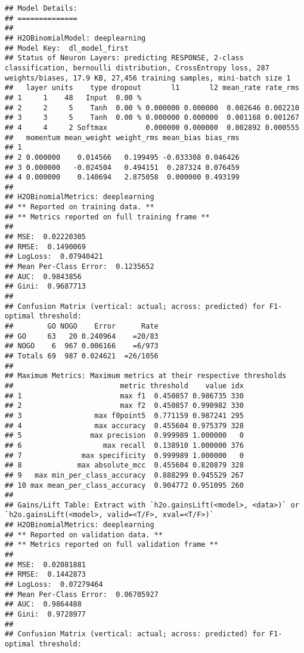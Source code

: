 \documentclass[]{article}
\begin{document}
\begin{verbatim}
## Model Details:
## ==============
## 
## H2OBinomialModel: deeplearning
## Model Key:  dl_model_first 
## Status of Neuron Layers: predicting RESPONSE, 2-class classification, bernoulli distribution, CrossEntropy loss, 287 weights/biases, 17.9 KB, 27,456 training samples, mini-batch size 1
##   layer units    type dropout       l1       l2 mean_rate rate_rms
## 1     1    48   Input  0.00 %                                     
## 2     2     5    Tanh  0.00 % 0.000000 0.000000  0.002646 0.002210
## 3     3     5    Tanh  0.00 % 0.000000 0.000000  0.001168 0.001267
## 4     4     2 Softmax         0.000000 0.000000  0.002892 0.000555
##   momentum mean_weight weight_rms mean_bias bias_rms
## 1                                                   
## 2 0.000000    0.014566   0.199495 -0.033308 0.046426
## 3 0.000000   -0.024504   0.494151  0.287324 0.076459
## 4 0.000000    0.140694   2.875058  0.000000 0.493199
## 
## H2OBinomialMetrics: deeplearning
## ** Reported on training data. **
## ** Metrics reported on full training frame **
## 
## MSE:  0.02220305
## RMSE:  0.1490069
## LogLoss:  0.07940421
## Mean Per-Class Error:  0.1235652
## AUC:  0.9843856
## Gini:  0.9687713
## 
## Confusion Matrix (vertical: actual; across: predicted) for F1-optimal threshold:
##        GO NOGO    Error      Rate
## GO     63   20 0.240964    =20/83
## NOGO    6  967 0.006166    =6/973
## Totals 69  987 0.024621  =26/1056
## 
## Maximum Metrics: Maximum metrics at their respective thresholds
##                         metric threshold    value idx
## 1                       max f1  0.450857 0.986735 330
## 2                       max f2  0.450857 0.990982 330
## 3                 max f0point5  0.771159 0.987241 295
## 4                 max accuracy  0.455604 0.975379 328
## 5                max precision  0.999989 1.000000   0
## 6                   max recall  0.138910 1.000000 376
## 7              max specificity  0.999989 1.000000   0
## 8             max absolute_mcc  0.455604 0.820879 328
## 9   max min_per_class_accuracy  0.888299 0.945529 267
## 10 max mean_per_class_accuracy  0.904772 0.951095 260
## 
## Gains/Lift Table: Extract with `h2o.gainsLift(<model>, <data>)` or `h2o.gainsLift(<model>, valid=<T/F>, xval=<T/F>)`
## H2OBinomialMetrics: deeplearning
## ** Reported on validation data. **
## ** Metrics reported on full validation frame **
## 
## MSE:  0.02081881
## RMSE:  0.1442873
## LogLoss:  0.07279464
## Mean Per-Class Error:  0.06705927
## AUC:  0.9864488
## Gini:  0.9728977
## 
## Confusion Matrix (vertical: actual; across: predicted) for F1-optimal threshold:

\end{verbatim}
\end{document}
